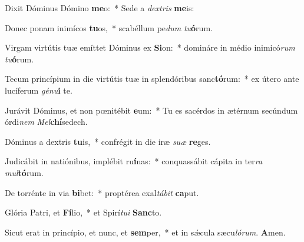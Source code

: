 \item Dixit Dóminus Dómino \textbf{me}o:~* Sede a \textit{dex}\textit{tris} \textbf{me}is:

\item Donec ponam inimícos \textbf{tu}os,~* scabéllum pe\textit{dum} \textit{tu}\textbf{ó}rum.

\item Virgam virtútis tuæ emíttet Dóminus ex \textbf{Si}on:~* domináre in médio inimicó\textit{rum} \textit{tu}\textbf{ó}rum.

\item Tecum princípium in die virtútis tuæ in splendóribus sanc\textbf{tó}rum:~* ex útero ante lucíferum \textit{gé}\textit{nu}\textbf{i} te.

\item Jurávit Dóminus, et non pœnitébit \textbf{e}um:~* Tu es sacérdos in ætérnum secúndum órdi\textit{nem} \textit{Mel}\textbf{chí}sedech.

\item Dóminus a dextris \textbf{tu}is,~* confrégit in die iræ \textit{su}\textit{æ} \textbf{re}ges.

\item Judicábit in natiónibus, implébit ru\textbf{í}nas:~* conquassábit cápita in ter\textit{ra} \textit{mul}\textbf{tó}rum.

\item De torrénte in via \textbf{bi}bet:~* proptérea exal\textit{tá}\textit{bit} \textbf{ca}put.

\item Glória Patri, et \textbf{Fí}lio,~* et Spirí\textit{tu}\textit{i} \textbf{Sanc}to.

\item Sicut erat in princípio, et nunc, et \textbf{sem}per,~* et in sǽcula sæcu\textit{ló}\textit{rum}. \textbf{A}men.
